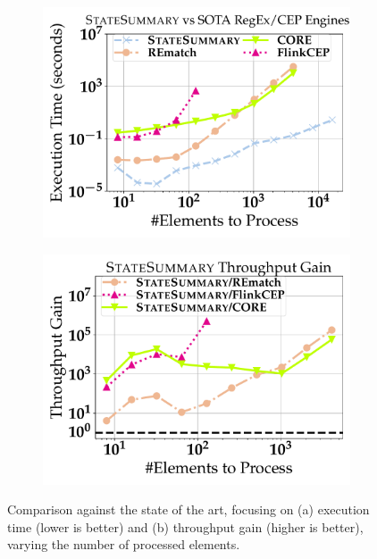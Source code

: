 \begin{figure}[t]
	\begin{subfigure}{.38\linewidth}
		\centering
		\includegraphics[width=1.0\linewidth]{revision_plots/suse_vs_rematch_vs_core_vs_flinkcep.pdf}
		\vspace{-18pt}
		\caption{}
		\label{plot:suse-vs-rematch-exec-time}
	\end{subfigure}
    \hfill
	\begin{subfigure}{.38\linewidth}
		\centering
		\includegraphics[width=1.0\linewidth]{revision_plots/throughput_gain_over_rematch_core_flinkcep.pdf}
		\vspace{-18pt}
		\caption{}
		\label{plot:suse-vs-rematch-throughput-gain}
	\end{subfigure}
	\vspace{-1em}
    \hfill
    \caption{Comparison against the state of the art, focusing on (a)
    execution time (lower is better) and (b) throughput gain (higher is
    better), varying the number of processed elements.}
	\label{fig:suse_vs_rematch}
	\vspace{-1em}
\end{figure}

